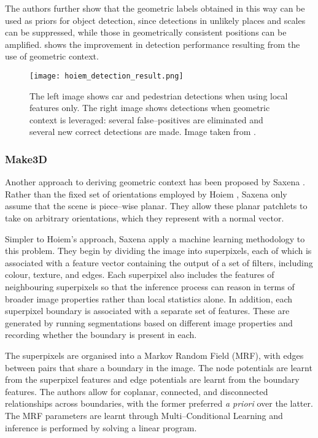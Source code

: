 The authors further show that the geometric labels obtained in this
way can be used as priors for object detection, since detections in
unlikely places and scales can be suppressed, while those in
geometrically consistent positions can be
amplified.  shows the improvement in detection
performance resulting from the use of geometric context.

\begin{figure}[tb]
\centering
\texttt{[image: hoiem\_detection\_result.png]}
\caption{The left image shows car and pedestrian detections when using
  local features only. The right image shows detections when geometric
  context is leveraged: several false--positives are eliminated and
  several new correct detections are made. Image taken from
  \cite{Hoiem06}.}
\label{fig:hoiem-result}
\end{figure}

\subsubsection{Make3D}

Another approach to deriving geometric context has been proposed by
Saxena \etal \cite{Saxena09}. Rather than the fixed set of
orientations employed by Hoiem \etal, Saxena \etal only assume that
the scene is piece--wise planar. They allow these planar patchlets to
take on arbitrary orientations, which they represent with a normal
vector.

Simpler to Hoiem's approach, Saxena \etal apply a machine learning
methodology to this problem. They begin by dividing the image into
superpixels, each of which is associated with a feature vector
containing the output of a set of filters, including colour, texture,
and edges. Each superpixel also includes the features of neighbouring
superpixels so that the inference process can reason in terms of
broader image properties rather than local statistics alone. In
addition, each superpixel boundary is associated with a separate set
of features. These are generated by running segmentations based on
different image properties and recording whether the boundary is
present in each.

The superpixels are organised into a Markov Random Field (MRF), with
edges between pairs that share a boundary in the image. The node
potentials are learnt from the superpixel features and edge
potentials are learnt from the boundary features. The authors allow
for coplanar, connected, and disconnected relationships across
boundaries, with the former preferred \textit{a priori} over the
latter. The MRF parameters are learnt through Multi--Conditional
Learning and inference is performed by solving a linear program.

